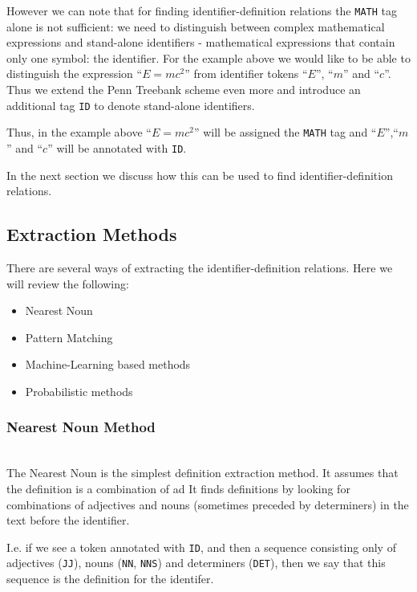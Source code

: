 However we can note that for finding identifier-definition relations 
the \texttt{MATH} tag alone is not sufficient: we need to distinguish 
between complex mathematical expressions and stand-alone identifiers - 
mathematical expressions that contain only one symbol: the identifier.
For the example above we would like to be able to distinguish the 
expression ``$E = mc^2$'' from identifier tokens ``$E$'',
``$m$'' and ``$c$''. Thus we extend the Penn Treebank scheme even more 
and introduce an additional tag \texttt{ID} to denote stand-alone identifiers. 


Thus, in the example above ``$E = mc^2$'' will be assigned the \texttt{MATH} tag
and ``$E$'',``$m$'' and ``$c$'' will be annotated with \texttt{ID}.

In the next section we discuss how this can be used to find identifier-definition 
relations.


\subsection{Extraction Methods} \label{sec:definition-extraction-methods}
There are several ways of extracting the identifier-definition relations.
Here we will review the following:

\begin{itemize}
\itemsep1pt\parskip0pt
  \item Nearest Noun
  \item Pattern Matching
  \item Machine-Learning based methods
  \item Probabilistic methods
\end{itemize}


\subsubsection{Nearest Noun Method}

\ \\

The Nearest Noun  \cite{grigore2009towards} \cite{yokoi2011contextual} 
is the simplest definition extraction method.
It assumes that the definition is a combination of ad
It finds definitions by looking for combinations of adjectives and nouns
(sometimes preceded by determiners) in the text before the identifier. 

I.e. if we see a token annotated with \texttt{ID}, and then a sequence 
consisting only of adjectives (\texttt{JJ}), nouns (\texttt{NN}, \texttt{NNS}) 
and determiners (\texttt{DET}), then we say that this sequence is 
the definition for the identifer. 

